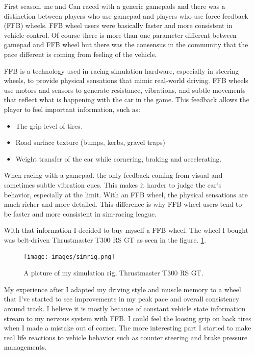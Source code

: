                 First season, me and Can raced with a generic gamepads and there was a distinction between players who use gamepad and players who use force feedback (FFB) wheels. FFB wheel users were basically faster and more consistent in vehicle control. Of course there is more than one parameter different between gamepad and FFB wheel but there was the consensus in the community that the pace different is coming from feeling of the vehicle.\par

                FFB is a technology used in racing simulation hardware, especially in steering wheels, to provide physical sensations that mimic real-world driving. FFB wheels use motors and sensors to generate resistance, vibrations, and subtle movements that reflect what is happening with the car in the game. This feedback allows the player to feel important information, such as:\par

                \begin{itemize}
                    \item The grip level of tires.
                    \item Road surface texture (bumps, kerbs, gravel traps)
                    \item Weight transfer of the car while cornering, braking and accelerating.
                \end{itemize}
                When racing with a gamepad, the only feedback coming from visual and sometimes subtle vibration cues. This makes it harder to judge the car's behavior, especially at the limit. With an FFB wheel, the physical sensations are much richer and more detailed. This difference is why FFB wheel users tend to be faster and more consistent in sim-racing league.

                With that information I decided to buy myself a FFB wheel. The wheel I bought was belt-driven Thrustmaster T300 RS GT as seen in the figure. \ref{fig:SIMRIG}. 

                \begin{figure}[H]
                    \centering
                    \texttt{[image: images/simrig.png]}
                    \caption{A picture of my simulation rig, Thrustmaster T300 RS GT.}
                    \label{fig:SIMRIG}
                \end{figure}

                My experience after I adapted my driving style and muscle memory to a wheel that I've started to see improvements in my peak pace and overall consistency around track. I believe it is mostly because of constant vehicle state information stream to my nervous system with FFB. I could feel the loosing grip on back tires when I made a mistake out of corner. The more interesting part I started to make real life reactions to vehicle behavior such as counter steering and brake pressure managements.

